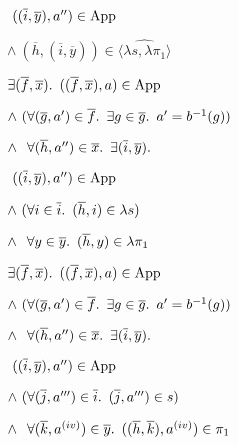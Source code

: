 \begin{itemize}
  \step
    \quad\quad\quad\phantom{$\land$}$~((\overline{i},\overline{y}),a^{\prime\prime})\in\operatorname{App}$

  \step
    \quad\quad\quad$\land~(\overline{h},(\overline{i},\overline{y}))\in\widehat{\langle\lambda s,\lambda\pi_1\rangle}$
  \addtolength{\itemsep}{.2\baselineskip}

  \step[\iffs]
    $\exists (\overline{f},\overline{x})\ldotp~((\overline{f},\overline{x}),a)\in\operatorname{App}$

  \addtolength{\itemsep}{-.2\baselineskip}
  \step
    \quad $\land~(\forall (\overline{g},a^\prime)\in\overline{f}\ldotp~\exists g\in\overline{g}\ldotp~a^\prime = b^{-1}(g))$

  \step
    \quad $\land~\phantom{(}\forall(\overline{h},a^{\prime\prime})\in\overline{x}\ldotp~\exists(\overline{i},\overline{y})\ldotp$

  \step
    \quad\quad\quad\phantom{$\land$}$~((\overline{i},\overline{y}),a^{\prime\prime})\in\operatorname{App}$

  \step
    \quad\quad\quad$\land~(\forall i\in\overline{i}\ldotp~(\overline{h},i)\in\lambda s)$

  \step
    \quad\quad\quad$\land~\phantom{(}\forall y\in\overline{y}\ldotp~(\overline{h},y)\in\lambda\pi_1$
  \addtolength{\itemsep}{.2\baselineskip}

  \step[\iffs]
    $\exists (\overline{f},\overline{x})\ldotp~((\overline{f},\overline{x}),a)\in\operatorname{App}$

  \addtolength{\itemsep}{-.2\baselineskip}
  \step
    \quad $\land~(\forall (\overline{g},a^\prime)\in\overline{f}\ldotp~\exists g\in\overline{g}\ldotp~a^\prime = b^{-1}(g))$

  \step
    \quad $\land~\phantom{(}\forall(\overline{h},a^{\prime\prime})\in\overline{x}\ldotp~\exists(\overline{i},\overline{y})\ldotp$

  \step
    \quad\quad\quad\phantom{$\land$}$~((\overline{i},\overline{y}),a^{\prime\prime})\in\operatorname{App}$

  \step
    \quad\quad\quad$\land~(\forall (\overline{j},a^{\prime\prime\prime})\in\overline{i}\ldotp~(\overline{j},a^{\prime\prime\prime})\in s)$
    \marginnote{\Def-$\lambda\cdot$}

  \step
    \quad\quad\quad$\land~\phantom{(}\forall (\overline{k},a^{\text (iv)})\in\overline{y}\ldotp~((\overline{h}, \overline{k}),a^{\text (iv)})\in\pi_1$
    \marginnote{\Def-$\lambda\cdot$}
  \addtolength{\itemsep}{.2\baselineskip}


\end{itemize}
